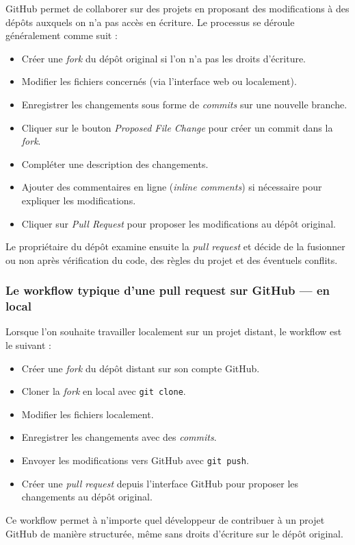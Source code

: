 \documentclass{article}
\begin{document}
GitHub permet de collaborer sur des projets en proposant des modifications à des dépôts auxquels on n’a pas accès en écriture.
Le processus se déroule généralement comme suit :
\begin{itemize}
    \item Créer une \textit{fork} du dépôt original si l’on n’a pas les droits d’écriture.
    \item Modifier les fichiers concernés (via l’interface web ou localement).
    \item Enregistrer les changements sous forme de \textit{commits} sur une nouvelle branche.
    \item Cliquer sur le bouton \textit{Proposed File Change} pour créer un commit dans la \textit{fork}.
    \item Compléter une description des changements.
    \item Ajouter des commentaires en ligne (\textit{inline comments}) si nécessaire pour expliquer les modifications.
    \item Cliquer sur \textit{Pull Request} pour proposer les modifications au dépôt original.
\end{itemize}
Le propriétaire du dépôt examine ensuite la \textit{pull request} et décide de la fusionner ou non après vérification du code, des règles du projet et des éventuels conflits.

\subsubsection{Le workflow typique d’une pull request sur GitHub — en local}

Lorsque l’on souhaite travailler localement sur un projet distant, le workflow est le suivant :
\begin{itemize}
    \item Créer une \textit{fork} du dépôt distant sur son compte GitHub.
    \item Cloner la \textit{fork} en local avec \texttt{git clone}.
    \item Modifier les fichiers localement.
    \item Enregistrer les changements avec des \textit{commits}.
    \item Envoyer les modifications vers GitHub avec \texttt{git push}.
    \item Créer une \textit{pull request} depuis l’interface GitHub pour proposer les changements au dépôt original.
\end{itemize}
Ce workflow permet à n’importe quel développeur de contribuer à un projet GitHub de manière structurée, même sans droits d’écriture sur le dépôt original.
\end{document}
